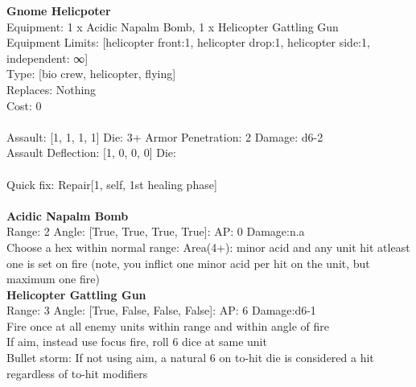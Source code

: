 {\bf Gnome Helicpoter } \\
Equipment: 1 x Acidic Napalm Bomb, 1 x Helicopter Gattling Gun \\
Equipment Limits: [helicopter front:1, helicopter drop:1, helicopter side:1, independent: ∞] \\
Type: [bio crew, helicopter, flying] \\
Replaces: Nothing \\
Cost: 0\\
\ \\
Assault: [1, 1, 1, 1] Die: 3+ Armor Penetration: 2 Damage: d6-2 \\
Assault Deflection: [1, 0, 0, 0] Die: \\
\indent  
\ \\
Quick fix: Repair[1, self, 1st healing phase]\\ 

\ \\
{\bf Acidic Napalm Bomb } \\



Range: 2  Angle: [True, True, True, True]: AP: 0 Damage:n.a \\
Choose a hex within normal range: Area(4+): minor acid and any unit hit atleast one is set on fire (note, you inflict one minor acid per hit on the unit, but maximum one fire)\\ 




{\bf Helicopter Gattling Gun } \\



Range: 3  Angle: [True, False, False, False]: AP: 6 Damage:d6-1 \\
Fire once at all enemy units within range and within angle of fire\\ 
If aim, instead use focus fire, roll 6 dice at same unit\\ 
Bullet storm: If not using aim, a natural 6 on to-hit die is considered a hit regardless of to-hit modifiers\\ 




 
\ \\



